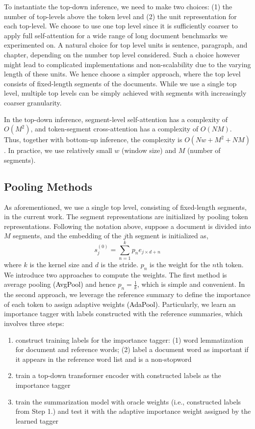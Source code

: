 To instantiate the top-down inference, we need to make two choices: (1) the number of top-levels above the token level and (2) the unit representation for each top-level. We choose to use one top level since it is sufficiently coarser to apply full self-attention for a wide range of long document benchmarks we experimented on. A natural choice for top level units is sentence, paragraph, and chapter, depending on the number top level considered. Such a choice however might lead to complicated implementations and non-scalability due to the varying length of these units. We hence choose a simpler approach, where the top level consists of fixed-length segments of the documents. While we use a single top level, multiple top levels can be simply achieved with segments with increasingly coarser granularity. 

In the top-down inference, segment-level self-attention has a complexity of $O(M^2)$, and token-segment cross-attention has a complexity of $O(NM)$. Thus, together with bottom-up inference, the complexity is $O(Nw + M^2 + NM)$. In practice, we use relatively small $w$ (window size) and $M$ (number of segments).

\subsection{Pooling Methods}
\label{sec:pooling}
As aforementioned, we use a single top level, consisting of fixed-length segments, in the current work. The segment representations are initialized by pooling token representations. Following the notation above, suppose a document is divided into $M$ segments, and the embedding of the $j$th segment is initialized as,
\begin{equation}
    s_j^{(0)} = \sum_{n=1}^k p_n e_{j \times d + n}
\end{equation}
where $k$ is the kernel size and $d$ is the stride. $p_n$ is the weight for the $n$th token. We introduce two approaches to compute the weights. The first method is average pooling \textcolor{black}{(AvgPool)} and hence $p_n = \frac{1}{k}$, which is simple and convenient. In the second approach, we leverage the reference summary to define the importance of each token to assign adaptive weights \textcolor{black}{(AdaPool)}. Particularly, we learn an importance tagger with labels constructed with the reference summaries, which involves three steps:
\begin{enumerate}
    \item construct training labels for the importance tagger: (1) word lemmatization for document and reference words; (2) label a document word as important if it appears in the reference word list and is a non-stopword
    \item train a top-down transformer encoder with constructed labels as the importance tagger
    \item train the summarization model with oracle weights (i.e., constructed labels from Step 1.) and test it with the adaptive importance weight assigned by the learned tagger
\end{enumerate}


